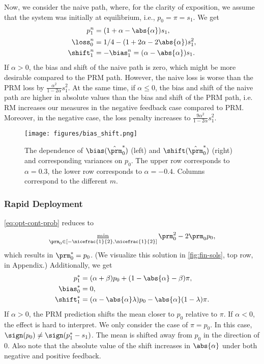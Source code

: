  Now, we consider the naive path, where, for the clarity of exposition, we
assume that the system was initially at equilibrium, i.e., $p_0 = \pi =
s_1$. We get
\[
    \begin{split}
        p^n_1 &= (1 + \alpha - \abs{\alpha}) s_1,\\
        \loss^n_0 &= 1/4 - (1 + 2 \alpha - 2 \abs{\alpha}) s_1^2,\\
        \shift^n_1 &= -\bias^n_1 = (\alpha - \abs{\alpha}) s_1.
    \end{split}
\]
If $\alpha > 0$, the bias and shift of the naive path is zero, which might be
more desirable compared to the PRM path. However, the naive loss is worse
than the PRM loss by $\frac{\alpha^2}{1 - 2 \alpha} s_1^2$.  At the same
time, if $\alpha \le 0$, the bias and shift of the naive path are higher in
absolute values than the bias and shift of the PRM path, i.e. RM increases our measures in the negative feedback case compared to PRM.
Moreover, in the negative case, the loss penalty increases to $\frac{9
\alpha^2}{1 - 2 \alpha} s_1^2$.

\begin{figure*}[ht]
    \texttt{[image: figures/bias\_shift.png]}
    \caption{The dependence of $\bias(\hat{\prm}^*_0)$ (left) and
    $\shift(\hat{\prm}^*_0)$ (right) and corresponding variances on $p_0$. The
    upper row corresponds to $\alpha=0.3$, the lower row corresponds to
    $\alpha=-0.4$. Columns correspond to the different $m$.}
    \label{fig: bias_shift}
\end{figure*}

\subsubsection{Rapid Deployment}

 \cref{eq:opt-cont-prob} reduces to
\[
    \min_{\prm_0 \in [-\nicefrac{1}{2}, \nicefrac{1}{2}]} \prm_0^2 - 2 \prm_0
    p_0,
\]
which results in $\prm^*_0 = p_0$. (We visualize this solution in
\cref{fig:fin-sols}, top row, in Appendix.) Additionally, we get
\[
    \begin{split}
        p^*_1 &= (\alpha + \beta) p_0 + (1 - \abs{\alpha} - \beta) \pi,\\
        \bias^*_0 &= 0,\\
        \shift^*_1 &= (\alpha - \abs{\alpha} \lambda) p_0 - \abs{\alpha} (1 -
        \lambda) \pi.
    \end{split}
\]
If $\alpha > 0$, the PRM prediction shifts the mean closer to $p_0$
relative to $\pi$. If $\alpha < 0$, the effect is hard to interpret. We
only consider the case of $\pi = p_0$. In this case, $\sign(p_0) \neq
\sign(p^*_1 - s_1)$. The mean is shifted away from $p_0$ in the direction of
$0$. Also note that the absolute value of the shift increases in
$\abs{\alpha}$ under both negative and positive feedback.

